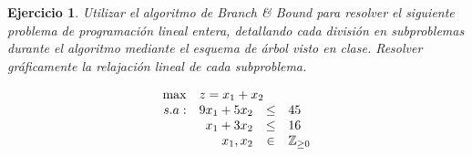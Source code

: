 \documentclass[a4paper,oneside,12pt]{amsart}
\newtheorem{quest}{Ejercicio}
\begin{document}



\begin{quest} 
Utilizar el algoritmo de Branch \& Bound para resolver el siguiente problema de programaci\'on lineal entera, detallando cada divisi\'on en subproblemas durante el algoritmo mediante el esquema de \'arbol visto en clase. Resolver gráficamente la relajación lineal de cada subproblema. 

\[
\begin{array}{rrcl}
\max & \multicolumn{3}{l}{z = x_1+x_2} \\
s.a: & 9x_1+5x_2 & \leq & 45 \\
 & x_1+3x_2 & \leq & 16 \\
 & x_1, x_2 & \in & \mathbb{Z}_{\geq 0}
\end{array}
\]



\end{quest}

\end{document}
